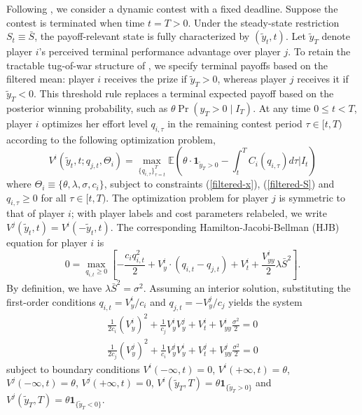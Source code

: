 \documentclass[mnsc]{informs3}
\begin{document}
Following \cite{Ryvkin2022Fight}, we consider a dynamic contest with a fixed deadline.
Suppose the contest is terminated when time $t=T>0$.
Under the steady-state restriction $S_t \equiv \bar S$, the payoff-relevant state is fully characterized by $(\tilde y_t,t)$.
Let $\tilde y_T$ denote player $i$'s perceived terminal performance advantage over player $j$.
To retain the tractable tug-of-war structure of \citet{Ryvkin2022Fight}, we specify terminal payoffs based on the filtered mean: player \(i\) receives the prize if \(\tilde y_T>0\), whereas player \(j\) receives it if \(\tilde y_T<0\). This threshold rule replaces a terminal expected payoff based on the posterior winning probability, such as \(\theta\Pr(y_T>0\mid I_T)\).
At any time $0\le t<T$, player $i$ optimizes her effort level $q_{i,\tau}$ in the remaining contest period $\tau\in[t, T)$ according to the following optimization problem,
\begin{equation}\label{v-def}
	V^i(\tilde{y}_{t}, t ; q_{j,t},\Theta_i) = \max_{\{q_{i,\tau}\}^T_{\tau=t}}
\mathbb{E}\left( \theta\cdot\mathbf{1}_{\tilde y_T>0} - \int^T_tC_i(q_{i,\tau})d\tau \bigg|I_t\right)
\end{equation}
where $\Theta_i \equiv\{\theta, \lambda, \sigma, c_i\}$, subject to constraints (\ref{filtered-x}), (\ref{filtered-S}) and $q_{i,\tau}\ge0$ for all $\tau\in[t,T)$.
The optimization problem for player $j$ is symmetric to that of player $i$; with player labels and cost parameters relabeled, we write $V^j(\tilde{y}_t, t) = V^i(-\tilde{y}_t, t)$.
The corresponding Hamilton-Jacobi-Bellman (HJB) equation for player $i$ is
\begin{equation*}
0 = \max_{q_{i,t}\ge0}\left[-\frac{c_iq_{i,t}^2}{2} + V^i_{y}\cdot\left(q_{i,t}-q_{j,t}\right)+V^i_t + \frac{V^i_{yy}}{2}\lambda \bar{S}^2\right].
\end{equation*}
By definition, we have $\lambda \bar{S}^2 = \sigma^2$.
Assuming an interior solution, substituting the first-order conditions $q_{i,t} = V^i_y/c_i$ and $q_{j,t} = -V^j_y/c_j$ yields the system
\begin{equation*}
\begin{aligned}
\frac{1}{2c_i}(V^i_y)^2 + \frac{1}{c_j}V^i_yV^j_y + V^i_t + V^i_{yy}\frac{\sigma^2}{2} = 0\\
\frac{1}{2c_j}(V^j_y)^2 + \frac{1}{c_i}V^j_yV^i_y + V^j_t + V^j_{yy}\frac{\sigma^2}{2} = 0
\end{aligned}
\end{equation*}
subject to boundary conditions $V^i(-\infty, t) = 0$, $V^i(+\infty, t) = \theta$, $V^j(-\infty, t) = \theta$, $V^j(+\infty, t)=0$, $V^i(\tilde{y}_T, T) = \theta \mathbf 1_{\{\tilde y_T>0\}}$ and $V^j(\tilde{y}_T, T) = \theta \mathbf 1_{\{\tilde y_T<0\}}$.
\end{document}
